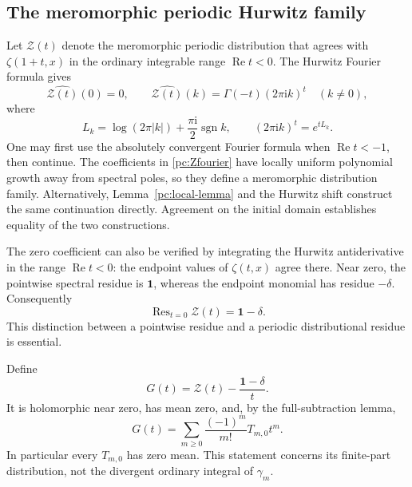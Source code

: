 \documentclass[11pt,a4paper]{article}
\numberwithin{equation}{section}
\theoremstyle{definition}
\newcommand{\ii}{\mathrm i}
\newcommand{\Res}{\operatorname{Res}}
\newcommand{\Rea}{\operatorname{Re}}
\newcommand{\sgn}{\operatorname{sgn}}
\newcommand{\CZ}{\mathscr Z}
\newcommand{\one}{\mathbf 1}
\begin{document}
\subsection{The meromorphic periodic Hurwitz family}
Let $\CZ(t)$ denote the meromorphic periodic distribution that agrees with $\zeta(1+t,x)$ in the ordinary integrable range $\Rea t<0$. The Hurwitz Fourier formula gives
\begin{equation}\label{pc:Zfourier}
\widehat{\CZ(t)}(0)=0,\qquad
\widehat{\CZ(t)}(k)=\Gamma(-t)(2\pi\ii k)^t\quad(k\ne0),
\end{equation}
where
\begin{equation}\label{pc:Lk}
L_k=\log(2\pi|k|)+\frac{\pi\ii}{2}\sgn k,
\qquad (2\pi\ii k)^t=e^{tL_k}.
\end{equation}
One may first use the absolutely convergent Fourier formula when $\Rea t<-1$, then continue. The coefficients in \eqref{pc:Zfourier} have locally uniform polynomial growth away from spectral poles, so they define a meromorphic distribution family. Alternatively, Lemma~\ref{pc:local-lemma} and the Hurwitz shift construct the same continuation directly. Agreement on the initial domain establishes equality of the two constructions.

The zero coefficient can also be verified by integrating the Hurwitz antiderivative in the range $\Rea t<0$: the endpoint values of $\zeta(t,x)$ agree there. Near zero, the pointwise spectral residue is $\one$, whereas the endpoint monomial has residue $-\delta$. Consequently
\begin{equation}\label{pc:residue}
\Res_{t=0}\CZ(t)=\one-\delta.
\end{equation}
This distinction between a pointwise residue and a periodic distributional residue is essential.

Define
\begin{equation}\label{pc:Gdist}
G(t)=\CZ(t)-\frac{\one-\delta}{t}.
\end{equation}
It is holomorphic near zero, has mean zero, and, by the full-subtraction lemma,
\begin{equation}\label{pc:Gcoeff}
G(t)=\sum_{m\ge0}\frac{(-1)^m}{m!}T_{m,0}t^m.
\end{equation}
In particular every $T_{m,0}$ has zero mean. This statement concerns its finite-part distribution, not the divergent ordinary integral of $\gamma_m$.
\end{document}
